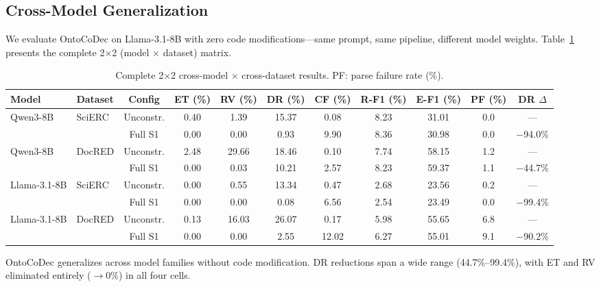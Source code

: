 \documentclass[11pt,a4paper]{article}
\newcommand{\sys}{OntoCoDec}
\begin{document}
\subsection{Cross-Model Generalization}
\label{sec:cross-model}

We evaluate \sys{} on Llama-3.1-8B with zero code modifications---same prompt, same pipeline, different model weights. Table~\ref{tab:cross-model} presents the complete 2$\times$2 (model $\times$ dataset) matrix.

\begin{table}[t]
\centering
\small
\caption{Complete 2$\times$2 cross-model $\times$ cross-dataset results. PF: parse failure rate (\%).}
\label{tab:cross-model}
\begin{tabular}{llccccccccc}
\toprule
\textbf{Model} & \textbf{Dataset} & \textbf{Config} & \textbf{ET (\%)} & \textbf{RV (\%)} & \textbf{DR (\%)} & \textbf{CF (\%)} & \textbf{R-F1 (\%)} & \textbf{E-F1 (\%)} & \textbf{PF (\%)} & \textbf{DR $\Delta$} \\
\midrule
\multirow{2}{*}{Qwen3-8B} & \multirow{2}{*}{SciERC} & Unconstr. & 0.40 & 1.39 & 15.37 & 0.08 & 8.23 & 31.01 & 0.0 & --- \\
 & & Full S1 & 0.00 & 0.00 & 0.93 & 9.90 & 8.36 & 30.98 & 0.0 & $-$94.0\% \\
\midrule
\multirow{2}{*}{Qwen3-8B} & \multirow{2}{*}{DocRED} & Unconstr. & 2.48 & 29.66 & 18.46 & 0.10 & 7.74 & 58.15 & 1.2 & --- \\
 & & Full S1 & 0.00 & 0.03 & 10.21 & 2.57 & 8.23 & 59.37 & 1.1 & $-$44.7\% \\
\midrule
\multirow{2}{*}{Llama-3.1-8B} & \multirow{2}{*}{SciERC} & Unconstr. & 0.00 & 0.55 & 13.34 & 0.47 & 2.68 & 23.56 & 0.2 & --- \\
 & & Full S1 & 0.00 & 0.00 & 0.08 & 6.56 & 2.54 & 23.49 & 0.0 & $-$99.4\% \\
\midrule
\multirow{2}{*}{Llama-3.1-8B} & \multirow{2}{*}{DocRED} & Unconstr. & 0.13 & 16.03 & 26.07 & 0.17 & 5.98 & 55.65 & 6.8 & --- \\
 & & Full S1 & 0.00 & 0.00 & 2.55 & 12.02 & 6.27 & 55.01 & 9.1 & $-$90.2\% \\
\bottomrule
\end{tabular}
\end{table}

\sys{} generalizes across model families without code modification. DR reductions span a wide range (44.7\%--99.4\%), with ET and RV eliminated entirely ($\to$0\%) in all four cells.
\end{document}
